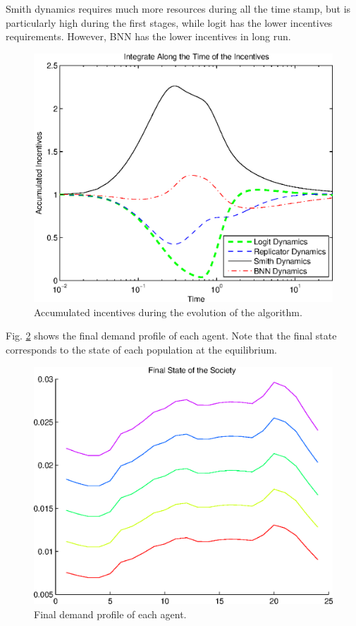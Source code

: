 Smith dynamics requires much more resources during all the time stamp, but is particularly high during the first stages, while logit has the lower incentives requirements. However, BNN has the lower incentives in long run.

\begin{figure}[hbt]
 \centering
 \includegraphics[width=.75\textwidth]{./images/accumulated_i.eps}
 \caption{Accumulated incentives during the evolution of the algorithm.}
 \label{fig:integral}
\end{figure}



Fig. \ref{fig:final_state} shows the final demand profile of each agent. Note that the final state corresponds to the state of each population at the equilibrium.

\begin{figure}[hbt]
 \centering
 \includegraphics[width=.75\textwidth]{./images/final_state.eps}
 \caption{Final demand profile of each agent.}
 \label{fig:final_state}
\end{figure}
